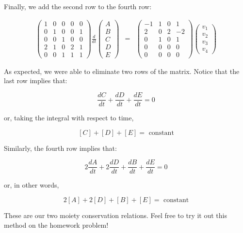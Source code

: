 \documentclass{article}
\begin{document}
Finally, we add the second row to the fourth row:

\begin{eqnarray*}
\begin{pmatrix} 1 & 0 & 0 & 0 & 0\\ 0 & 1 & 0 & 0 &1\\ 0 & 0 & 1 & 0 & 0\\ 2 & 1 & 0& 2 & 1\\ 0 & 0 & 1 & 1 & 1\end{pmatrix}
\frac{d}{dt} \begin{pmatrix} A\\ B \\ C\\ D\\ E \end{pmatrix} 
& = & \begin{pmatrix} -1 & 1 & 0 & 1\\
2 & 0 & 2 & -2\\
0 & 1 & 0 & 1\\
0 & 0 & 0 & 0\\
0 & 0 & 0 & 0
\end{pmatrix} \begin{pmatrix} v_1\\ v_2 \\ v_3 \\ v_4 \end{pmatrix}
\end{eqnarray*}

As expected, we were able to eliminate two rows of the matrix. Notice that the last row implies that:

\[ \frac{dC}{dt} + \frac{dD}{dt} + \frac{dE}{dt} = 0 \]

or, taking the integral with respect to time,

\[ \left[ C \right] + \left[ D \right] + \left[ E \right] = \textrm{ constant} \]

Similarly, the fourth row implies that:

\[ 2 \frac{dA}{dt} + 2 \frac{dD}{dt} + \frac{dB}{dt} + \frac{dE}{dt} = 0 \]

or, in other words,

\[ 2 \left[ A \right] + 2 \left[ D \right]+ \left[ B \right]  + \left[ E \right] = \textrm{ constant} \]

These are our two moiety conservation relations. Feel free to try it out this method on the homework problem!
\end{document}

